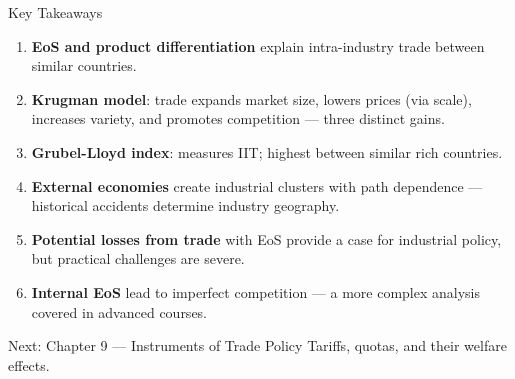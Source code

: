 \documentclass[aspectratio=169]{beamer}
\begin{document}
\begin{frame}{Key Takeaways}
\begin{enumerate}
  \item \textbf{EoS and product differentiation} explain intra-industry trade between similar countries.
  \item \textbf{Krugman model}: trade expands market size, lowers prices (via scale), increases variety, and promotes competition --- three distinct gains.
  \item \textbf{Grubel-Lloyd index}: measures IIT; highest between similar rich countries.
  \item \textbf{External economies} create industrial clusters with path dependence --- historical accidents determine industry geography.
  \item \textbf{Potential losses from trade} with EoS provide a case for industrial policy, but practical challenges are severe.
  \item \textbf{Internal EoS} lead to imperfect competition --- a more complex analysis covered in advanced courses.
\end{enumerate}
\begin{block}{Next: Chapter 9 --- Instruments of Trade Policy}
  Tariffs, quotas, and their welfare effects.
\end{block}
\end{frame}
\end{document}
